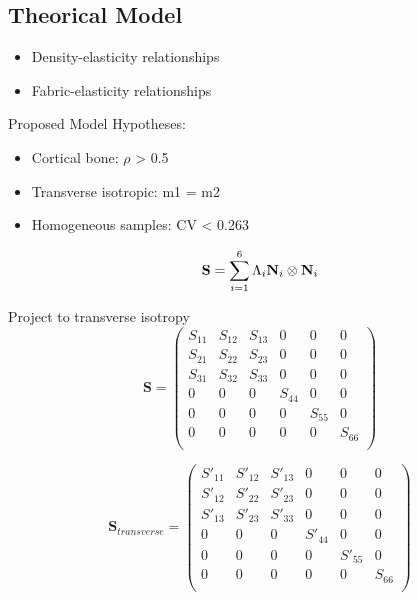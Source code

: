 \documentclass[a4paper,fleqn]{DC_ArtStyle}
\begin{document}
	\subsection{Theorical Model}
	\begin{itemize}
		\item Density-elasticity relationships
		\item Fabric-elasticity relationships
	\end{itemize}

	Proposed Model
	Hypotheses:
	\begin{itemize}
		\item Cortical bone: $\rho$ > 0.5
		\item Transverse isotropic: m1 = m2
		\item Homogeneous samples: CV < 0.263
	\end{itemize}
	\begin{equation}
		\mathbf{S} = \sum_{i=1}^{6} \Lambda_{i} \mathbf{N}_i \otimes \mathbf{N}_i\\
	\end{equation}

	Project to transverse isotropy
	\begin{equation}
		\mathbf{S} =
		\begin{pmatrix}
			S_{11} & S_{12} & S_{13} & 0 & 0 & 0 \\
			S_{21} & S_{22} & S_{23} & 0 & 0 & 0 \\
			S_{31} & S_{32} & S_{33} & 0 & 0 & 0 \\
			0 & 0 & 0 & S_{44} & 0 & 0 \\
			0 & 0 & 0 & 0 & S_{55} & 0 \\
			0 & 0 & 0 & 0 & 0 & S_{66} \\
		\end{pmatrix}
	\end{equation}

	\begin{equation}
		\mathbf{S}_{transverse} =
		\begin{pmatrix}
			S'_{11} & S'_{12} & S'_{13} & 0 & 0 & 0 \\
			S'_{12} & S'_{22} & S'_{23} & 0 & 0 & 0 \\
			S'_{13} & S'_{23} & S'_{33} & 0 & 0 & 0 \\
			0 & 0 & 0 & S'_{44} & 0 & 0 \\
			0 & 0 & 0 & 0 & S'_{55} & 0 \\
			0 & 0 & 0 & 0 & 0 & S_{66} \\
		\end{pmatrix}
	\end{equation}
\end{document}

